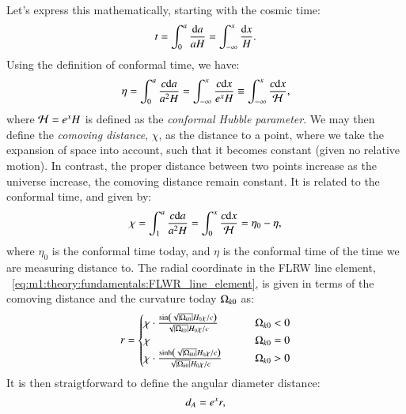     Let's express this mathematically, starting with the cosmic time:
    \begin{equation}\label{eq:m1:theory:measures:cosmic_time}
        t = \int_0^a\frac{\mathrm{d} a}{aH} = \int_{-\infty}^{x}\frac{\mathrm{d} x}{H}.
    \end{equation}
    Using the definition of conformal time, we have:
    \begin{equation}\label{eq:m1:theory:measures:conformal_time}
        \eta = \int_0^a\frac{c\mathrm{d} a}{a^2H} = \int_{-\infty}^{x}\frac{c\mathrm{d} x}{e^xH} \equiv \int_{-\infty}^{x}\frac{c\mathrm{d} x}{\mathcal{H}},
    \end{equation}
    where $\mathcal{H}=e^xH$ is defined as the \textit{conformal Hubble parameter}. We may then define the \textit{comoving distance}, $\chi$, as the distance to a point, where we take the expansion of space into account, such that it becomes constant (given no relative motion). In contrast, the proper distance between two points increase as the universe increase, the comoving distance remain constant. It is related to the conformal time, and given by:
    \begin{equation}
        \label{eq:m1:theory:measures:conformal ditance}
        \chi = \int_1^a\frac{c\mathrm{d} a}{a^2H} = \int_0^x\frac{c\mathrm{d} x}{\mathcal{H}} = \eta_0-\eta,
    \end{equation}
    where $\eta_0$ is the conformal time today, and $\eta$ is the conformal time of the time we are measuring distance to.
    The radial coordinate in the FLRW line element, ~\cref{eq:m1:theory:fundamentals:FLWR_line_element}, is given in terms of the comoving distance and the curvature today $\Omega_{k0}$ as:
    \begin{equation}\label{eq:m1:theory:measures:r_equation_def}
        r = \begin{cases}
            \chi \cdot \frac{\sin\left(\sqrt{\abs{\Omega_{k0}}}H_0\chi/c\right)}{\sqrt{\abs{\Omega_{k0}}}H_0\chi/c} \qquad &\Omega_{k0} < 0 \\
            \chi \qquad &\Omega_{k0} = 0 \\
            \chi \cdot \frac{\sinh\left(\sqrt{\abs{\Omega_{k0}}}H_0\chi/c\right)}{\sqrt{\abs{\Omega_{k0}}}H_0\chi/c} \qquad &\Omega_{k0} > 0
        \end{cases}
    \end{equation}
    It is then straigtforward to define the angular diameter distance:
    \begin{equation}\label{eq:m1:theory:measures:angular_distance_def}
        d_A = e^{x}r,
    \end{equation}

